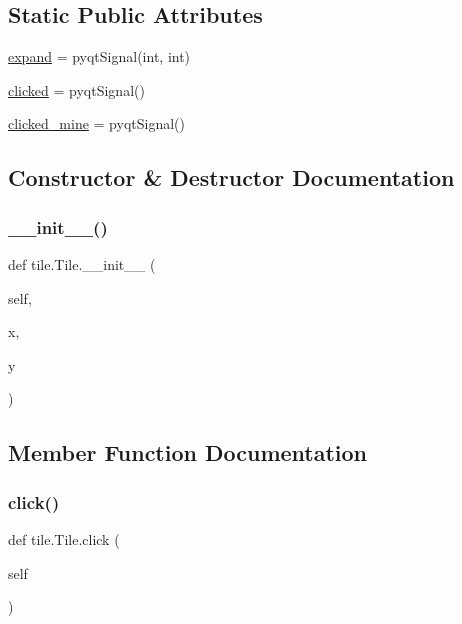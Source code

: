 \subsection*{Static Public Attributes}
\begin{DoxyCompactItemize}
\item 
\mbox{\hyperlink{classtile_1_1_tile_ae9b20af77c912b727aabee12e0619af7}{expand}} = pyqt\+Signal(int, int)
\item 
\mbox{\hyperlink{classtile_1_1_tile_ae9f624960119eb87e6d64a1563ac6079}{clicked}} = pyqt\+Signal()
\item 
\mbox{\hyperlink{classtile_1_1_tile_a944560e1cb2bb5ccd3849527fc5dd736}{clicked\+\_\+mine}} = pyqt\+Signal()
\end{DoxyCompactItemize}


\subsection{Constructor \& Destructor Documentation}
\mbox{\label{classtile_1_1_tile_a4f02fc7ff22b66bbf6d4660eab79ad8a}} 
\subsubsection{\texorpdfstring{\_\_init\_\_()}{\_\_init\_\_()}}
{\footnotesize\ttfamily def tile.\+Tile.\+\_\+\+\_\+init\+\_\+\+\_\+ (\begin{DoxyParamCaption}\item[{}]{self,  }\item[{}]{x,  }\item[{}]{y }\end{DoxyParamCaption})}



\subsection{Member Function Documentation}
\mbox{\label{classtile_1_1_tile_a024a479a7f7a0b8b4cc9c77f913bb6e3}} 
\subsubsection{\texorpdfstring{click()}{click()}}
{\footnotesize\ttfamily def tile.\+Tile.\+click (\begin{DoxyParamCaption}\item[{}]{self }\end{DoxyParamCaption})}

